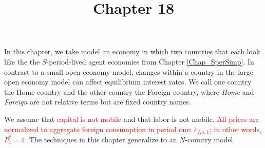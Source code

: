 \documentclass[letterpaper,12pt]{article}
\theoremstyle{definition}
\begin{document}
\title{Chapter 18}
\maketitle

In this chapter, we take model an economy in which two countries that each look like the the $S$-period-lived agent economies from Chapter \ref{Chap_SperSimp}. In contrast to a small open economy model, changes within a country in the large open economy model can affect equilibrium interest rates. We call one country the Home country and the other country the Foreign country, where \textit{Home} and \textit{Foreign} are not relative terms but are fixed country names.

We assume that \textcolor{red}{capital is not mobile} and that labor is not mobile.
\textcolor{red}{All prices are normalized to aggregate foreign consumption in period one: $c_{f,s,1}$; in other words, $P^*_1 = 1$.} The techniques in this chapter generalize to an $N$-country model.
\end{document}
